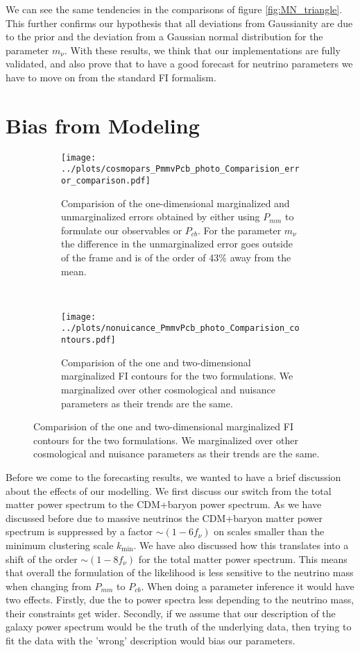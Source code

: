 \documentclass[../main.tex]{subfiles}
\begin{document}
We can see the same tendencies in the comparisons of figure \ref{fig:MN_triangle}. This further confirms our hypothesis that all deviations from Gaussianity are due to the prior and the deviation from a Gaussian normal distribution for the parameter $m_\nu$. With these results, we think that our implementations are fully validated, and also prove that to have a good forecast for neutrino parameters we have to move on from the standard FI formalism. 
\section{Bias from Modeling}
\begin{figure}
    \centering
    \caption{We show the effect of switching the formulation of our observables to use $P_{mm}$ instead of $P_{cb}$. We compare the results of the fisher forecast for the photometric optimistic using \cosmicfish:\class as our code.}
    \begin{subfigure}[b]{0.70\textwidth}
        \centering
        \texttt{[image: ../plots/cosmopars\_PmmvPcb\_photo\_Comparision\_error\_comparison.pdf]}
        \caption{Comparision of the one-dimensional marginalized and unmarginalized errors obtained by either using $P_{mm}$ to formulate our observables or $P_{cb}$. For the parameter $m_\nu$ the difference in the unmarginalized error goes outside of the frame and is of the order of 43\% away from the mean.}
        \label{fig:dotsPcbVPmm}
    \end{subfigure}
    \\
    \begin{subfigure}[b]{0.70\textwidth}
        \centering
        \texttt{[image: ../plots/nonuicance\_PmmvPcb\_photo\_Comparision\_contours.pdf]}
        \caption{Comparision of the one and two-dimensional marginalized FI contours for the two formulations. We marginalized over other cosmological and nuisance parameters as their trends are the same.}
        \label{fig:trianglePcbVPmm}
    \end{subfigure}
       \label{fig:PcbVPmm} 
\end{figure}
Before we come to the forecasting results, we wanted to have a brief discussion about the effects of our modelling. We first discuss our switch from the total matter power spectrum to the CDM+baryon power spectrum. As we have discussed before due to massive neutrinos the CDM+baryon matter power spectrum is suppressed by a factor $\sim(1-6f_\nu)$ on scales smaller than the minimum clustering scale $k_\mathrm{min}$. We have also discussed how this translates into a shift of the order $\sim(1-8f_\nu)$ for the total matter power spectrum. This means that overall the formulation of the likelihood is less sensitive to the neutrino mass when changing from $P_{mm}$ to $P_{cb}$. When doing a parameter inference it would have two effects. Firstly, due the to power spectra less depending to the neutrino mass, their constraints get wider. Secondly, if we assume that our description of the galaxy power spectrum would be the truth of the underlying data, then trying to fit the data with the 'wrong' description would bias our parameters.\\
\end{document}
